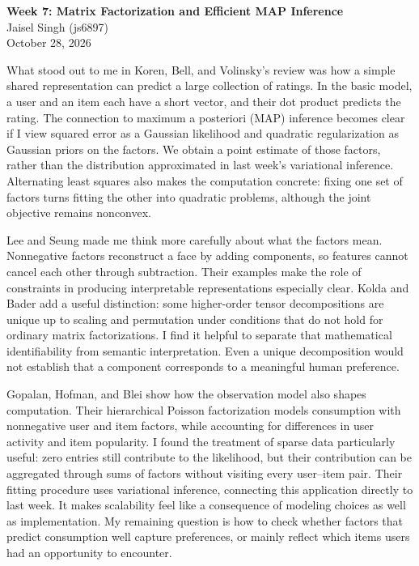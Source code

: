 \documentclass[12pt]{article}
\begin{document}
\begin{flushleft}
\textbf{Week 7: Matrix Factorization and Efficient MAP Inference} \\
Jaisel Singh (js6897) \\
October 28, 2026
\end{flushleft}

\vspace{0.1in}

What stood out to me in Koren, Bell, and Volinsky's review was how a simple
shared representation can predict a large collection of ratings. In the basic
model, a user and an item each have a short vector, and their dot product
predicts the rating. The connection to maximum a posteriori (MAP) inference
becomes clear if I view squared error as a Gaussian likelihood and quadratic
regularization as Gaussian priors on the factors. We obtain a point estimate
of those factors, rather than the distribution approximated in last week's
variational inference. Alternating least squares also makes the computation
concrete: fixing one set of factors turns fitting the other into quadratic
problems, although the joint objective remains nonconvex.

Lee and Seung made me think more carefully about what the factors mean.
Nonnegative factors reconstruct a face by adding components, so features cannot
cancel each other through subtraction. Their examples make the role of
constraints in producing interpretable representations especially clear.
Kolda and Bader add a useful distinction: some higher-order tensor
decompositions are unique up to scaling and permutation under conditions that
do not hold for ordinary matrix factorizations. I find it helpful to separate
that mathematical identifiability from semantic interpretation. Even a unique
decomposition would not establish that a component corresponds to a meaningful
human preference.

Gopalan, Hofman, and Blei show how the observation model also shapes computation.
Their hierarchical Poisson factorization models consumption with nonnegative
user and item factors, while accounting for differences in user activity and
item popularity. I found the treatment of sparse data particularly useful:
zero entries still contribute to the likelihood, but their contribution can be
aggregated through sums of factors without visiting every user--item pair.
Their fitting procedure uses variational inference, connecting this application
directly to last week. It makes scalability feel like a consequence of modeling
choices as well as implementation. My remaining question is how to check
whether factors that predict consumption well capture preferences, or mainly
reflect which items users had an opportunity to encounter.
\end{document}
